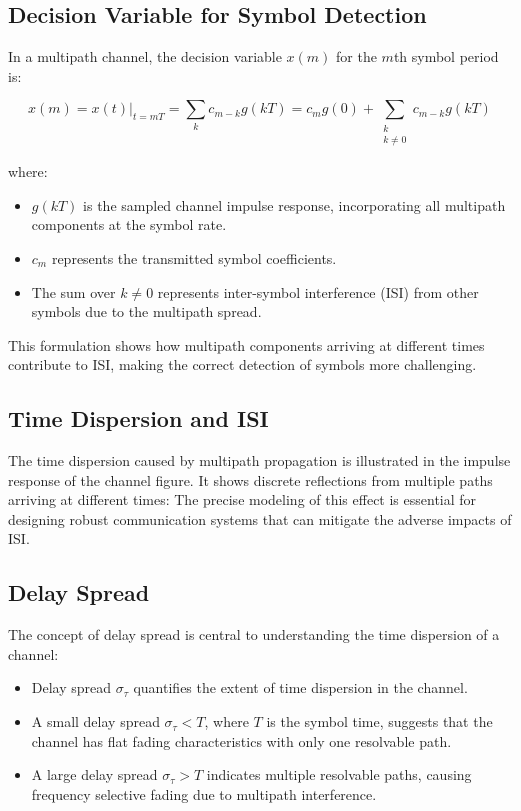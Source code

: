 \subsection*{Decision Variable for Symbol Detection}

In a multipath channel, the decision variable \( x(m) \) for the \( m \)th symbol period is:

\begin{equation}
    x(m) = x(t) \Big|_{t=mT} = \sum_{k} c_{m-k} g(kT) = c_m g(0) + \sum_{\substack{k \\ k \neq 0}} c_{m-k} g(kT)
\end{equation}

where:
\begin{itemize}
    \item \( g(kT) \) is the sampled channel impulse response, incorporating all multipath components at the symbol rate.
    \item \( c_m \) represents the transmitted symbol coefficients.
    \item The sum over \( k \neq 0 \) represents inter-symbol interference (ISI) from other symbols due to the multipath spread.
\end{itemize}

This formulation shows how multipath components arriving at different times contribute to ISI, making the correct detection of symbols more challenging.

\subsection*{Time Dispersion and ISI}

The time dispersion caused by multipath propagation is illustrated in the impulse response of the channel figure. It shows discrete reflections from multiple paths arriving at different times:
The precise modeling of this effect is essential for designing robust communication systems that can mitigate the adverse impacts of ISI.


\subsection*{Delay Spread}

The concept of delay spread is central to understanding the time dispersion of a channel:

\begin{itemize}
    \item Delay spread \( \sigma_{\tau} \) quantifies the extent of time dispersion in the channel.
    \item A small delay spread \( \sigma_{\tau} < T \), where \( T \) is the symbol time, suggests that the channel has flat fading characteristics with only one resolvable path.
    \item A large delay spread \( \sigma_{\tau} > T \) indicates multiple resolvable paths, causing frequency selective fading due to multipath interference.
\end{itemize}

